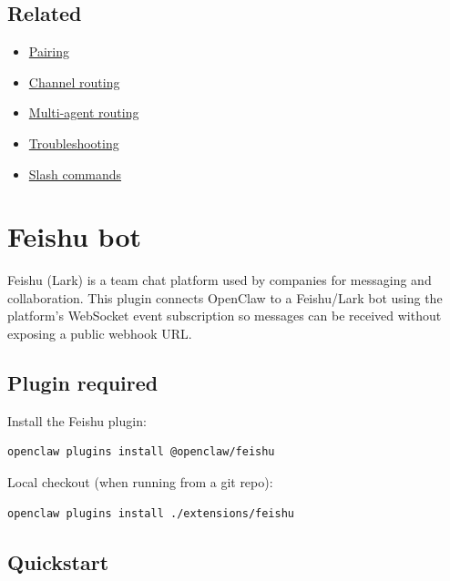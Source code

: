 \subsection{Related}


\begin{itemize}
  \item \href{/channels/pairing}{Pairing}
  \item \href{/channels/channel-routing}{Channel routing}
  \item \href{/concepts/multi-agent}{Multi-agent routing}
  \item \href{/channels/troubleshooting}{Troubleshooting}
  \item \href{/tools/slash-commands}{Slash commands}
\end{itemize}



\clearpage

\section{Feishu bot}


Feishu (Lark) is a team chat platform used by companies for messaging and collaboration. This plugin connects OpenClaw to a Feishu/Lark bot using the platform’s WebSocket event subscription so messages can be received without exposing a public webhook URL.

\hrulefill


\subsection{Plugin required}


Install the Feishu plugin:

\begin{lstlisting}[language=bash]
openclaw plugins install @openclaw/feishu
\end{lstlisting}


Local checkout (when running from a git repo):

\begin{lstlisting}[language=bash]
openclaw plugins install ./extensions/feishu
\end{lstlisting}


\hrulefill


\subsection{Quickstart}


